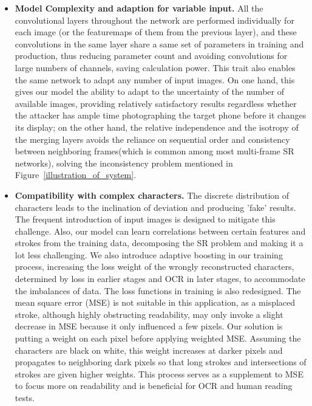 \begin{itemize}
    \item \textbf{Model Complexity and adaption for variable input.} All the convolutional layers throughout the network are performed individually for each image (or the featuremaps of them from the previous layer), and these convolutions in the same layer share a same set of parameters in training and production, thus reducing parameter count and avoiding convolutions for large numbers of channels, saving calculation power. This trait also enables the same network to adapt any number of input images. On one hand, this gives our model the ability to adapt to the uncertainty of the number of available images, providing relatively satisfactory results regardless whether the attacker has ample time photographing the target phone before it changes its display; on the other hand, the relative independence and the isotropy of the merging layers avoids the reliance on sequential order and consistency between neighboring frames(which is common among most multi-frame SR networks), solving the inconsistency problem mentioned in Figure~\ref{illustration_of_system}.
    \item \textbf{Compatibility with complex characters.} The discrete distribution of characters leads to the inclination of deviation and producing 'fake' results. The frequent introduction of input images is designed to mitigate this challenge. Also, our model can learn correlations between certain features and strokes from the training data, decomposing the SR problem and making it a lot less challenging. We also introduce adaptive boosting\cite{adaboost} in our training process, increasing the loss weight of the wrongly reconstructed characters, determined by loss in earlier stages and OCR in later stages, to accommodate the imbalances of data. The loss functions in training is also redesigned. The mean square error (MSE) is not suitable in this application, as a misplaced stroke, although highly obstructing readability, may only invoke a slight decrease in MSE because it only influenced a few pixels. Our solution is putting a weight on each pixel before applying weighted MSE. Assuming the characters are black on white, this weight increases at darker pixels and propagates to neighboring dark pixels so that long strokes and intersections of strokes are given higher weights. This process serves as a supplement to MSE to focus more on readability and is beneficial for OCR and human reading tests. 
  \end{itemize}

